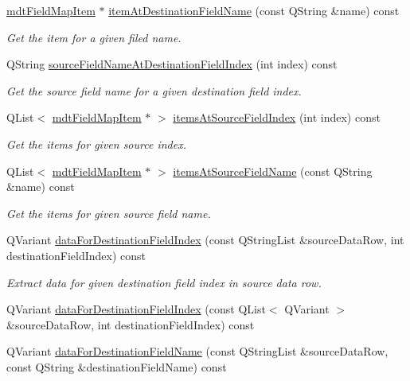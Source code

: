 \begin{DoxyCompactItemize}
\hyperlink{classmdt_field_map_item}{mdt\-Field\-Map\-Item} $\ast$ \hyperlink{classmdt_field_map_a8602e13e3294e834324305a1d65cc8dd}{item\-At\-Destination\-Field\-Name} (const Q\-String \&name) const 
\begin{DoxyCompactList}\small\item\em Get the item for a given filed name. \end{DoxyCompactList}\item 
Q\-String \hyperlink{classmdt_field_map_ad0a700ed332b2b73e1b28533d35ad344}{source\-Field\-Name\-At\-Destination\-Field\-Index} (int index) const 
\begin{DoxyCompactList}\small\item\em Get the source field name for a given destination field index. \end{DoxyCompactList}\item 
Q\-List$<$ \hyperlink{classmdt_field_map_item}{mdt\-Field\-Map\-Item} $\ast$ $>$ \hyperlink{classmdt_field_map_ad0d7d88a3d262b48744cfe564b2bf37d}{items\-At\-Source\-Field\-Index} (int index) const 
\begin{DoxyCompactList}\small\item\em Get the items for given source index. \end{DoxyCompactList}\item 
Q\-List$<$ \hyperlink{classmdt_field_map_item}{mdt\-Field\-Map\-Item} $\ast$ $>$ \hyperlink{classmdt_field_map_a30fb87695d60cc2d1212def4530fe3f6}{items\-At\-Source\-Field\-Name} (const Q\-String \&name) const 
\begin{DoxyCompactList}\small\item\em Get the items for given source field name. \end{DoxyCompactList}\item 
Q\-Variant \hyperlink{classmdt_field_map_a732aba70514367a36d849146bb9024f9}{data\-For\-Destination\-Field\-Index} (const Q\-String\-List \&source\-Data\-Row, int destination\-Field\-Index) const 
\begin{DoxyCompactList}\small\item\em Extract data for given destination field index in source data row. \end{DoxyCompactList}\item 
Q\-Variant \hyperlink{classmdt_field_map_a4e33322d4f442e25c425cf3d484e6df7}{data\-For\-Destination\-Field\-Index} (const Q\-List$<$ Q\-Variant $>$ \&source\-Data\-Row, int destination\-Field\-Index) const 
\item 
Q\-Variant \hyperlink{classmdt_field_map_a37e51cb2b3d32a742f9fff51021d0a5c}{data\-For\-Destination\-Field\-Name} (const Q\-String\-List \&source\-Data\-Row, const Q\-String \&destination\-Field\-Name) const 

\end{DoxyCompactItemize}
